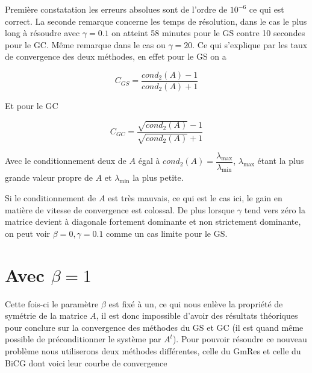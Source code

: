 \documentclass[twoside,12pt]{report}
\theoremstyle{remark}
\begin{document}
Première constatation les erreurs absolues sont de l'ordre de $10^{-6}$ ce qui est correct. La seconde remarque concerne les temps de résolution, dans le cas le plus long à résoudre avec $\gamma = 0.1$ on atteint 58 minutes pour le GS contre 10 secondes pour le GC\@. Même remarque dans le cas ou $\gamma= 20$. Ce qui s'explique par les taux de convergence des deux méthodes, en effet pour le GS on a

\begin{equation*}
C_{GS}=\dfrac{cond_2(A)-1}{cond_2(A)+1}
\end{equation*}

Et pour le GC

\begin{equation*}
C_{GC}=\dfrac{\sqrt{cond_2(A)}-1}{\sqrt{cond_2(A)}+1}
\end{equation*}

Avec le conditionnement deux de $A$ égal à $cond_2(A)=\dfrac{\lambda_{\max}}{\lambda_{\min}}$, $\lambda_{\max}$ étant la plus grande valeur propre de $A$ et $\lambda_{\min}$ la plus petite.

Si le conditionnement de $A$ est très mauvais, ce qui est le cas ici, le gain en matière de vitesse de convergence est colossal. De plus lorsque $\gamma$ tend vers zéro la matrice devient à diagonale fortement dominante et non strictement dominante, on peut voir $\beta=0,\gamma=0.1$ comme un cas limite pour le GS\@.

\section{Avec \texorpdfstring{$\beta =1$}{B}}

Cette fois-ci le paramètre $\beta$ est fixé à un, ce qui nous enlève la propriété de symétrie de la matrice $A$, il est donc impossible d'avoir des résultats théoriques pour conclure sur la convergence des méthodes du GS et GC (il est quand même possible de préconditionner le système par $A^t$). Pour pouvoir résoudre ce nouveau problème nous utiliserons deux méthodes différentes, celle du GmRes et celle du BiCG dont voici leur courbe de convergence
\end{document}
